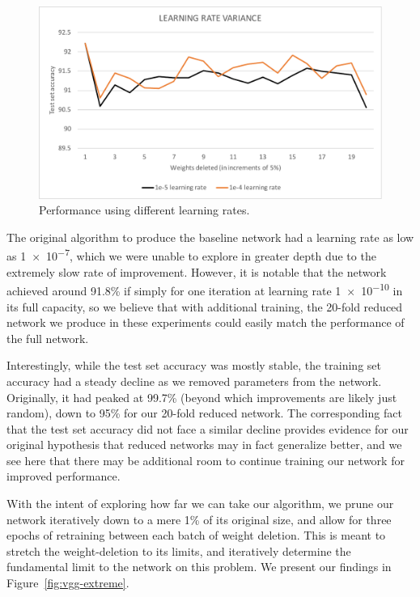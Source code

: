 \documentclass[10pt,twocolumn,letterpaper]{article}
\begin{document}
\begin{figure}[h]
  \centering
  \includegraphics[width=\linewidth]{cifar-learn-rate.pdf}
  \caption{Performance using different learning rates.}
  \label{fig:vgg-learn}
\end{figure}

The original algorithm to produce the baseline network had a learning rate as low as \num{1e-7}, which we were unable to explore in greater depth due to the extremely slow rate of improvement.
However, it is notable that the network achieved around 91.8\% if simply for one iteration at learning rate \num{1e-10} in its full capacity, so we believe that with additional training, the 20-fold reduced network we produce in these experiments could easily match the performance of the full network.

Interestingly, while the test set accuracy was mostly stable, the training set accuracy had a steady decline as we removed parameters from the network.
Originally, it had peaked at 99.7\% (beyond which improvements are likely just random), down to 95\% for our 20-fold reduced network.
The corresponding fact that the test set accuracy did not face a similar decline provides evidence for our original hypothesis that reduced networks may in fact generalize better, and we see here that there may be additional room to continue training our network for improved performance.

With the intent of exploring how far we can take our algorithm, we prune our network iteratively down to a mere 1\% of its original size, and allow for three epochs of retraining between each batch of weight deletion.
This is meant to stretch the weight-deletion to its limits, and iteratively determine the fundamental limit to the network on this problem.
We present our findings in Figure~\ref{fig:vgg-extreme}.
\end{document}
